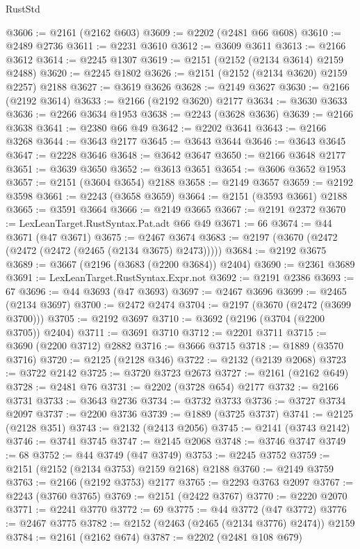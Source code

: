 \begin{lexlean}{RustStd}
\begin{coremodule}
@3606 := @2161 (@2162 @603)
@3609 := @2202 (@2481 @66 @608)
@3610 := @2489 @2736
@3611 := @2231 @3610
@3612 := @3609 @3611
@3613 := @2166 @3612
@3614 := @2245 @1307
@3619 := @2151 (@2152 (@2134 @3614) @2159 @2488)
@3620 := @2245 @1802
@3626 := @2151 (@2152 (@2134 @3620) @2159 @2257) @2188
@3627 := @3619 @3626
@3628 := @2149 @3627
@3630 := @2166 (@2192 @3614)
@3633 := @2166 (@2192 @3620) @2177
@3634 := @3630 @3633
@3636 := @2266 @3634 @1953
@3638 := @2243 (@3628 @3636)
@3639 := @2166 @3638
@3641 := @2380 @66 @49
@3642 := @2202 @3641
@3643 := @2166 @3268
@3644 := @3643 @2177
@3645 := @3643 @3644
@3646 := @3643 @3645
@3647 := @2228 @3646
@3648 := @3642 @3647
@3650 := @2166 @3648 @2177
@3651 := @3639 @3650
@3652 := @3613 @3651
@3654 := @3606 @3652 @1953
@3657 := @2151 (@3604 @3654) @2188
@3658 := @2149 @3657
@3659 := @2192 @3598
@3661 := @2243 (@3658 @3659)
@3664 := @2151 (@3593 @3661) @2188
@3665 := @3591 @3664
@3666 := @2149 @3665
@3667 := @2191 @2372
@3670 := LexLeanTarget.RustSyntax.Pat.adt @66 @49
@3671 := 66
@3674 := @44 @3671 (@47 @3671)
@3675 := @2467 @3674
@3683 := @2197 (@3670 (@2472 (@2472 (@2472 (@2465 (@2134 @3675) @2473)))))
@3684 := @2192 @3675
@3689 := @3667 (@2196 (@3683 (@2200 @3684)) @2404)
@3690 := @2361 @3689
@3691 := LexLeanTarget.RustSyntax.Expr.not
@3692 := @2191 @2386
@3693 := 67
@3696 := @44 @3693 (@47 @3693)
@3697 := @2467 @3696
@3699 := @2465 (@2134 @3697)
@3700 := @2472 @2474
@3704 := @2197 (@3670 (@2472 (@3699 @3700)))
@3705 := @2192 @3697
@3710 := @3692 (@2196 (@3704 (@2200 @3705)) @2404)
@3711 := @3691 @3710
@3712 := @2201 @3711
@3715 := @3690 (@2200 @3712) @2882
@3716 := @3666 @3715
@3718 := @1889 (@3570 @3716)
@3720 := @2125 (@2128 @346)
@3722 := @2132 (@2139 @2068)
@3723 := @3722 @2142
@3725 := @3720 @3723 @2673
@3727 := @2161 (@2162 @649)
@3728 := @2481 @76
@3731 := @2202 (@3728 @654) @2177
@3732 := @2166 @3731
@3733 := @3643 @2736
@3734 := @3732 @3733
@3736 := @3727 @3734 @2097
@3737 := @2200 @3736
@3739 := @1889 (@3725 @3737)
@3741 := @2125 (@2128 @351)
@3743 := @2132 (@2413 @2056)
@3745 := @2141 (@3743 @2142)
@3746 := @3741 @3745
@3747 := @2145 @2068
@3748 := @3746 @3747
@3749 := 68
@3752 := @44 @3749 (@47 @3749)
@3753 := @2245 @3752
@3759 := @2151 (@2152 (@2134 @3753) @2159 @2168) @2188
@3760 := @2149 @3759
@3763 := @2166 (@2192 @3753) @2177
@3765 := @2293 @3763 @2097
@3767 := @2243 (@3760 @3765)
@3769 := @2151 (@2422 @3767)
@3770 := @2220 @2070
@3771 := @2241 @3770
@3772 := 69
@3775 := @44 @3772 (@47 @3772)
@3776 := @2467 @3775
@3782 := @2152 (@2463 (@2465 (@2134 @3776) @2474)) @2159
@3784 := @2161 (@2162 @674)
@3787 := @2202 (@2481 @108 @679)

\end{coremodule}
\end{lexlean}
